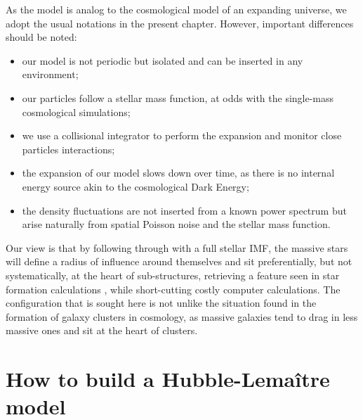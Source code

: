 As the model is analog to the cosmological model of an expanding universe, we adopt the usual notations in the present chapter. However, important differences should be noted:
\begin{itemize}
\item our model is not periodic but isolated and can be inserted in any environment;
\item our particles follow a stellar mass function, at odds with the single-mass cosmological simulations;
\item we use a collisional integrator to perform the expansion and monitor close particles interactions;
\item the expansion of our model slows down over time, as there is no internal energy source akin to the cosmological Dark Energy;
\item the density fluctuations are not inserted from a known power spectrum but arise naturally from spatial Poisson noise and the stellar mass function.
\end{itemize}

Our view is that by following through with a full stellar IMF, the massive stars will define a radius of influence around themselves and sit preferentially, but not systematically, at the heart of sub-structures, retrieving a feature seen in star formation calculations \citep{Moeckel2011,Maschberger2010}, while short-cutting  costly computer calculations. The configuration that is sought here is not unlike the situation found in the formation of galaxy clusters in cosmology, as massive galaxies tend to drag in less massive ones and sit at the heart of clusters.

%



\section{How to build a Hubble-Lema\^itre model}

